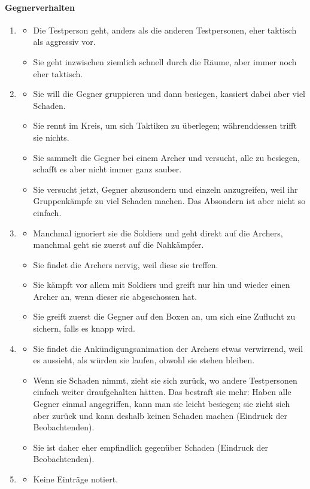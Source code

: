 \documentclass[../Main.tex]{subfiles}
\begin{document}
\paragraph{Gegnerverhalten}
\begin{enumerate}[label=\textbf{B\arabic*}, leftmargin=1.5cm, itemsep=0.8em]
\item
\begin{itemize}[nosep]
\item Die Testperson geht, anders als die anderen Testpersonen, eher taktisch als aggressiv vor.
\item Sie geht inzwischen ziemlich schnell durch die Räume, aber immer noch eher taktisch.
\end{itemize}
\item
\begin{itemize}[nosep]
\item Sie will die Gegner gruppieren und dann besiegen, kassiert dabei aber viel Schaden.
\item Sie rennt im Kreis, um sich Taktiken zu überlegen; währenddessen trifft sie nichts.
\item Sie sammelt die Gegner bei einem Archer und versucht, alle zu besiegen, schafft es aber nicht immer ganz sauber.
\item Sie versucht jetzt, Gegner abzusondern und einzeln anzugreifen, weil ihr Gruppenkämpfe zu viel Schaden machen. Das Absondern ist aber nicht so einfach.
\end{itemize}
\item
\begin{itemize}[nosep]
\item Manchmal ignoriert sie die Soldiers und geht direkt auf die Archers, manchmal geht sie zuerst auf die Nahkämpfer.
\item Sie findet die Archers nervig, weil diese sie treffen.
\item Sie kämpft vor allem mit Soldiers und greift nur hin und wieder einen Archer an, wenn dieser sie abgeschossen hat.
\item Sie greift zuerst die Gegner auf den Boxen an, um sich eine Zuflucht zu sichern, falls es knapp wird.
\end{itemize}
\item
\begin{itemize}[nosep]
\item Sie findet die Ankündigungsanimation der Archers etwas verwirrend, weil es aussieht, als würden sie laufen, obwohl sie stehen bleiben.
\item Wenn sie Schaden nimmt, zieht sie sich zurück, wo andere Testpersonen einfach weiter draufgehalten hätten. Das bestraft sie mehr: Haben alle Gegner einmal angegriffen, kann man sie leicht besiegen; sie zieht sich aber zurück und kann deshalb keinen Schaden machen (Eindruck der Beobachtenden).
\item Sie ist daher eher empfindlich gegenüber Schaden (Eindruck der Beobachtenden).
\end{itemize}
\item
\begin{itemize}[nosep]
\item Keine Einträge notiert.
\end{itemize}
\end{enumerate}
\end{document}
